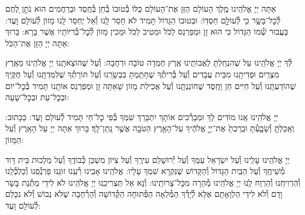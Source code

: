 \documentclass[twoside, openany, parskip=half, 11pt]{book}
\begin{document}
\nextpage
{}
אַתָּה יְיָ אֱלֹהֵֽינוּ מֶֽלֶךְ הָעוֹלָם הַזָּן אֶת־הָעוֹלָם כֻּלּוֹ בְּ֯טוּבוֹ בְּ֯חֵן בְּ֯חֶֽסֶד וּבְרַחֲמִים הוּא נֹתֵ֣ן לֶ֭חֶם לְ֯כׇל־בָּשָׂ֑ר כִּ֖י לְ֯עוֹלָ֣ם חַסְדּֽוֹ: וּבְטוּבוֹ הַגָּדוֹל תָּמִיד לֹא חָסַר לָֽנוּ וְ֯אַל יֶחְסַר לָֽנוּ מָזוֹן לְ֯עוֹלָם וָעֶד: בַּעֲבוּר שְׁ֯מוֹ הַגָּדוֹל כִּי הוּא זָן וּמְפַרְנֵס לַכֹּל וּמֵטִיב לַכֹּל וּמֵכִין מָזוֹן לְ֯כׇל־בְּ֯רִיּוֹתָיו אֲשֶׁר בָּרָא: בָּרוּךְ אַתָּה יְיָ הַזָּן אֶת־הַכֹּל:



לְּ֯ךָ יְיָ אֱלֹהֵֽינוּ עַל שֶׁהִנְחַֽלְתָּ לַאֲבוֹתֵֽינוּ אֶֽרֶץ חֶמְדָה טוֹבָה וּרְחָבָה: וְ֯עַל שֶׁהוֹצֵאתָֽנוּ יְיָ אֱלֹהֵֽינוּ מֵאֶֽרֶץ מִצְרַֽיִם וּפְדִיתָֽנוּ מִבֵּית עֲבָדִים וְ֯עַל בְּ֯רִיתְ֯ךָ שֶׁחָתַֽמְתָּ בִּבְשָׂרֵֽנוּ וְ֯עַל תּוֹרָתְ֯ךָ שֶׁלִּמַּדְתָּֽנוּ וְ֯עַל חֻקֶּֽיךָ שֶׁהוֹדַעְתָּֽנוּ וְ֯עַל חַיִּים חֵן וָחֶֽסֶד שֶׁחוֹנַנְתָּֽנוּ וְ֯עַל אֲכִילַת מָזוֹן שָׁאַתָּה זָן וּמְפַרְנֵס אוֹתָֽנוּ תָּמִיד בְּ֯כׇל־יוֹם וּבְכׇל־עֵת וּבְכׇל־שָׁעָה:


\alhanisim

יְיָ אֱלֹהֵֽינוּ אָֽנוּ מוֹדִים לָךְ וּמְבָרְ֯כִים אוֹתָךְ יִתְבָּרַךְ שִׁמְךָ בְּ֯פִי כׇל־חַי תָּמִיד לְ֯עוֹלָם וָעֶד: כַּכָּתוּב: וְאָֽכַלְתָּ֖ וְ֯שָׂבָ֑עְ֯תָּ וּבֵֽרַכְתָּ֙ אֶת־יְיָ֣ אֱלֹהֶ֔יךָ עַל־הָאָ֥רֶץ הַטֹּבָ֖ה אֲשֶׁ֥ר נָֽתַן־לָֽךְ׃ בָּרוּךְ אַתָּה יְיָ עַל הָאָֽרֶץ וְ֯עַל הַמָּזוֹן:



יְיָ אֱלֹהֵֽינוּ עָלֵֽינוּ וְ֯עַל יִשְׂרָאֵל עַמֶּךָ וְ֯עַל יְ֯רוּשָׁלַ‍ִם עִירֶֽךָ וְ֯עַל צִיּוֹן מִשְׁכַּן כְּ֯בוֹדֶֽךָ וְ֯עַל מַלְכוּת בֵּית דָּוִד מְ֯שִׁיחֶֽךָ וְ֯עַל הַבַּֽיִת הַגָּדוֹל וְ֯הַקָּדוֹשׁ שֶׁנִּקְרָא שִׁמְךָ עָלָיו: אֱלֹהֵֽינוּ אָבִֽינוּ רְ֯עֵֽנוּ זוּנֵֽנוּ פַרְנְ֯סֵֽנוּ וְ֯כַלְכְּ֯לֵֽנוּ וְ֯הַרְוִיחֵֽנוּ וְ֯הַרְוַח לָֽנוּ יְיָ אֱלֹהֵֽינוּ מְ֯הֵרָה מִכׇּל־צָרוֹתֵֽינוּ: וְ֯נָא אַל תַּצְרִיכֵֽנוּ יְיָ אֱלֹהֵֽינוּ לֹא לִידֵי מַתְּ֯נַת בָּשָׂר וָדָם וְ֯לֹא לִידֵי הַלְוָאָתָם אֶלָּא לְ֯יָדְ֯ךָ הַמְּ֯לֵאָה הַפְּ֯תוּחָה הַקְּ֯דוֹשָׁה וְ֯הָרְ֯חָבָה שֶׁלֹּא נֵבוֹשׁ וְ֯לֹא נִכָּלֵם לְ֯עוֹלָם וָעֶד:

\enlargethispage{\baselineskip}
\end{document}
